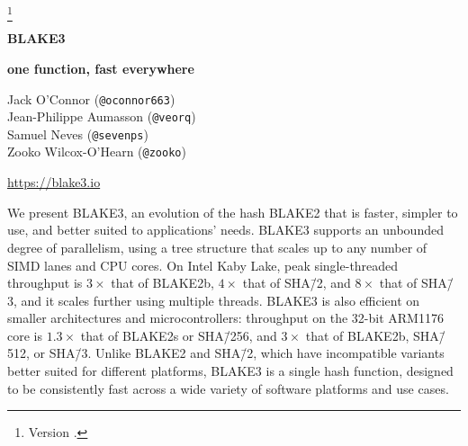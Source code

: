 \documentclass[11pt,notitlepage,a4paper]{article}
\title{\mytitle}
\newcommand{\mytitle}{BLAKE3}
\begin{document}
\selectfont
\pagestyle{plain}

\let\thefootnote\relax\footnote{Version \texttt{\pdfdate}.}
\addtocounter{footnote}{-1}\let\thefootnote\svthefootnote

\begin{center}
{\Huge \bf \mytitle}

\medskip

{\Large \bf  one function, fast everywhere}

\medskip

Jack O'Connor (\texttt{@oconnor663}) \\
Jean-Philippe Aumasson (\texttt{@veorq}) \\
Samuel Neves (\texttt{@sevenps}) \\
Zooko Wilcox-O'Hearn (\texttt{@zooko}) \\

\medskip

{\large \url{https://blake3.io}}

\end{center}


\medskip

\begin{center}
  \begin{minipage}{0.92\linewidth}

      We present BLAKE3, an evolution of the hash BLAKE2 that is faster,
      simpler to use, and better suited to applications' needs.
      BLAKE3 supports an unbounded degree of parallelism, using a tree
      structure that scales up to any number of SIMD lanes and CPU
      cores.  
      On Intel Kaby Lake, peak single-threaded throughput is $3\times$
      that of BLAKE2b, $4\times$ that of SHA\=/2, and $8\times$ that of
      SHA\=/3, and it scales further using multiple threads. 
      BLAKE3 is also efficient on smaller architectures and
      microcontrollers: throughput on the 32-bit ARM1176 core is
      $1.3\times$ that of BLAKE2s or SHA\=/256, and $3\times$ that of
      BLAKE2b, SHA\=/512, or SHA\=/3. 
      Unlike BLAKE2 and SHA\=/2, which have incompatible variants better
      suited for different platforms, BLAKE3 is a single hash function,
      designed to be consistently fast across a wide variety of software
      platforms and use cases.

   \end{minipage}
\end{center}

\newpage

\tableofcontents
\end{document}
